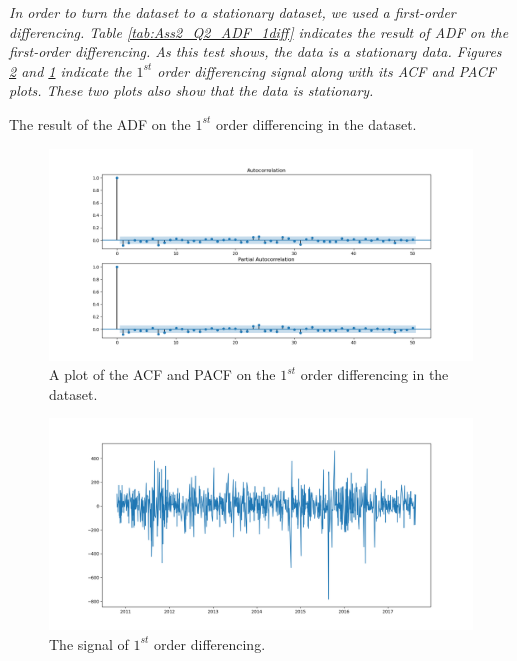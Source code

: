 \textit{In order to turn the dataset to a stationary dataset, we used a first-order differencing. Table \ref{tab:Ass2_Q2_ADF_1diff} indicates the result of \gls{ADF}  on the first-order differencing. As this test shows, the data is a stationary data. Figures \ref{fig:Ass2_Q2_1diff_signal} and \ref{fig:Ass2_Q2_PACF_ACF_1diff} indicate the $1^{st}$ order differencing signal along with its \gls{ACF} and \gls{PACF} plots. These two plots also show that the data is stationary. }

\begin{table}[H]
\centering
\caption{The result of the \gls{ADF} on the $1^{st}$ order differencing in the dataset.}
\label{tab:Ass2_Q2_ADF_1diff}

\end{table}

\begin{figure}[H]
    \centering
    \begin{minipage}[b]{1\textwidth}
        \includegraphics[width=\textwidth]{manuscript/src/figures/Ass2/Ass2_Q2_PACF_ACF_1diff.png}
    \end{minipage}
    \caption{ A plot of the \gls{ACF} and \gls{PACF} on the $1^{st}$ order differencing in the dataset.}
    \label{fig:Ass2_Q2_PACF_ACF_1diff}
\end{figure}
\begin{figure}[H]
    \centering
    \begin{minipage}[b]{1\textwidth}
        \includegraphics[width=\textwidth]{manuscript/src/figures/Ass2/Ass2_Q2_1diff_signal.png}
    \end{minipage}
    \caption{ The signal of $1^{st}$ order differencing.}
    \label{fig:Ass2_Q2_1diff_signal}
\end{figure}



